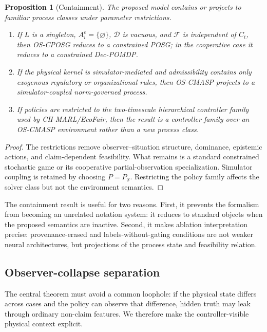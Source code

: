 \documentclass[11pt]{article}
\newcommand{\OSCPOSG}{\mbox{\normalfont\textsc{OS-CPOSG}}}
\newcommand{\OSCMASP}{\mbox{\normalfont\textsc{OS-CMASP}}}
\newcommand{\1}{\mathbf{1}}
\theoremstyle{definition}
\theoremstyle{plain}
\newtheorem{proposition}[definition]{Proposition}
\theoremstyle{remark}
\begin{document}
\begin{proposition}[Containment]
\label{prop:containment}
The proposed model contains or projects to familiar process classes under parameter restrictions.
\begin{enumerate}[leftmargin=1.4em]
  \item If $L$ is a singleton, $A_i^e=\{\varnothing\}$, $\mathcal D$ is vacuous, and $\mathcal F$ is independent of $C_t$, then \OSCPOSG{} reduces to a constrained POSG; in the cooperative case it reduces to a constrained Dec-POMDP.
  \item If the physical kernel is simulator-mediated and admissibility contains only exogenous regulatory or organizational rules, then \OSCMASP{} projects to a simulator-coupled norm-governed process.
  \item If policies are restricted to the two-timescale hierarchical controller family used by CH-MARL/EcoFair, then the result is a controller family over an \OSCMASP{} environment rather than a new process class.
\end{enumerate}
\end{proposition}

\begin{proof}
The restrictions remove observer--situation structure, dominance, epistemic actions, and claim-dependent feasibility. What remains is a standard constrained stochastic game or its cooperative partial-observation specialization. Simulator coupling is retained by choosing $P=P_{\mathcal S}$. Restricting the policy family affects the solver class but not the environment semantics.
\end{proof}

The containment result is useful for two reasons. First, it prevents the formalism from becoming an unrelated notation system: it reduces to standard objects when the proposed semantics are inactive. Second, it makes ablation interpretation precise: provenance-erased and labels-without-gating conditions are not weaker neural architectures, but projections of the process state and feasibility relation.

\subsection{Observer-collapse separation}

The central theorem must avoid a common loophole: if the physical state differs across cases and the policy can observe that difference, hidden truth may leak through ordinary non-claim features. We therefore make the controller-visible physical context explicit.
\end{document}
